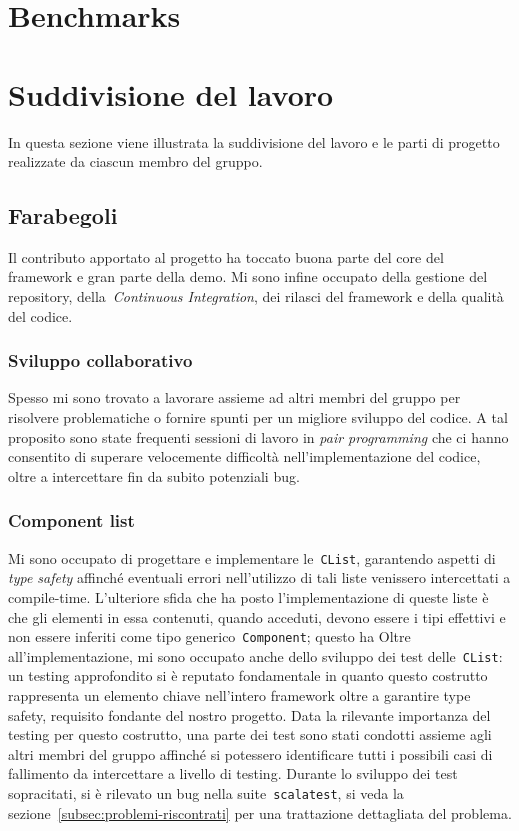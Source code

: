 \section{Benchmarks}\label{sec:benchmarks}

\section{Suddivisione del lavoro}\label{sec:suddivisione-del-lavoro}
In questa sezione viene illustrata la suddivisione del lavoro e le parti di progetto realizzate da ciascun membro del
gruppo.

\subsection{Farabegoli}\label{subsec:farabegoli}
Il contributo apportato al progetto ha toccato buona parte del core del framework e gran parte della demo.
Mi sono infine occupato della gestione del repository, della~\textit{Continuous Integration}, dei rilasci del framework
e della qualità del codice.

\subsubsection{Sviluppo collaborativo}
Spesso mi sono trovato a lavorare assieme ad altri membri del gruppo per risolvere problematiche o fornire spunti per
un migliore sviluppo del codice.
A tal proposito sono state frequenti sessioni di lavoro in \textit{pair programming} che ci hanno consentito di superare
velocemente difficoltà nell'implementazione del codice, oltre a intercettare fin da subito potenziali bug.

\subsubsection{Component list}
Mi sono occupato di progettare e implementare le~\texttt{CList}, garantendo aspetti di \textit{type safety} affinché
eventuali errori nell'utilizzo di tali liste venissero intercettati a compile-time.
L'ulteriore sfida che ha posto l'implementazione di queste liste è che gli elementi in essa contenuti, quando acceduti,
devono essere i tipi effettivi e non essere inferiti come tipo generico~\texttt{Component}; questo ha
Oltre all'implementazione, mi sono occupato anche dello sviluppo dei test delle~\texttt{CList}: un testing approfondito
si è reputato fondamentale in quanto questo costrutto rappresenta un elemento chiave nell'intero framework oltre a
garantire type safety, requisito fondante del nostro progetto.
Data la rilevante importanza del testing per questo costrutto, una parte dei test sono stati condotti assieme agli altri
membri del gruppo affinché si potessero identificare tutti i possibili casi di fallimento da intercettare a livello di
testing.
Durante lo sviluppo dei test sopracitati, si è rilevato un bug nella suite~\texttt{scalatest}, si veda la
sezione~\ref{subsec:problemi-riscontrati} per una trattazione dettagliata del problema.

